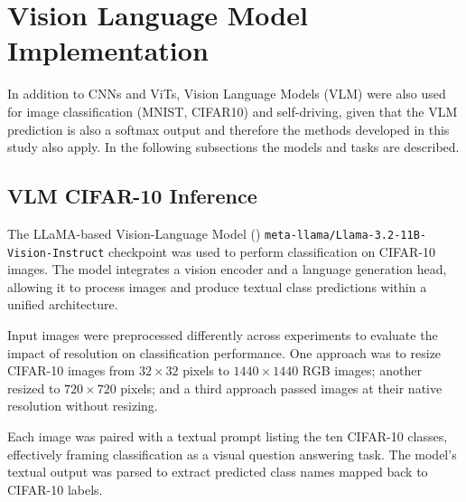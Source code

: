 

\section{Vision Language Model Implementation}
\label{methods:vlm_implementation}

In addition to CNNs and ViTs, Vision Language Models (VLM) were also used for image classification (MNIST, CIFAR10) and self-driving, given that the VLM prediction is also a softmax output and therefore the methods developed in this study also apply. In the following subsections the models and tasks are described.

\subsection{VLM CIFAR-10 Inference}
\label{methods:vlm_cifar10}

The LLaMA-based Vision-Language Model (\cite{touvron2023llamaopenefficientfoundation, meta2024llama3vision}) \texttt{meta-llama/Llama-3.2-11B-Vision-Instruct} checkpoint was used to perform classification on CIFAR-10 images. The model integrates a vision encoder and a language generation head, allowing it to process images and produce textual class predictions within a unified architecture.

Input images were preprocessed differently across experiments to evaluate the impact of resolution on classification performance. One approach was to resize CIFAR-10 images from $32 \times 32$ pixels to $1440 \times 1440$ RGB images; another resized to $720 \times 720$ pixels; and a third approach passed images at their native resolution without resizing.

Each image was paired with a textual prompt listing the ten CIFAR-10 classes, effectively framing classification as a visual question answering task. The model’s textual output was parsed to extract predicted class names mapped back to CIFAR-10 labels.

